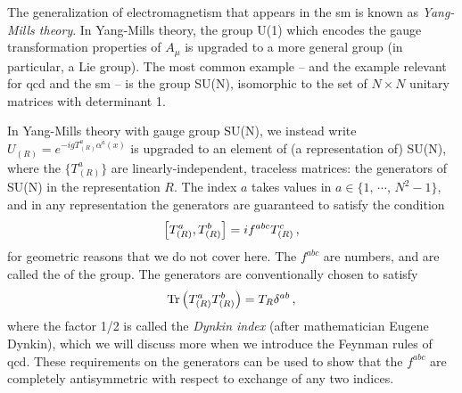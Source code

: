 The generalization of electromagnetism that appears in the \gls{sm} is known as \textit{Yang-Mills theory}.
%
In Yang-Mills theory, the group U(1) which encodes the gauge transformation properties of \(A_\mu\) is upgraded to a more general group (in particular, a Lie group).
%
The most common example -- and the example relevant for \gls{qcd} and the \gls{sm} -- is the group SU(N), isomorphic to the set of \(N\times N\) unitary matrices with determinant 1.



In Yang-Mills theory with gauge group SU(N), we instead write \(U_{(R)} = e^{-i g T_{(R)}^a \alpha^a(x)}\) is upgraded to an element of (a representation of) SU(N), where the \(\{T^a_{(R)}\}\) are linearly-independent, traceless matrices:
%
the generators of SU(N) in the representation \(R\).
%
The index \(a\) takes values in \(a \in \{1,\,\cdots,\,N^2-1\}\), and in any representation the generators are guaranteed to satisfy the condition
\begin{align}
    \comm{T^a_{(R)}}{T^b_{(R)}}
    =
    i f^{abc} T^c_{(R)}
    \,,
\end{align}
for geometric reasons that we do not cover here.
%
The \(f^{abc}\) are numbers, and are called the  of the group.
%
The generators are conventionally chosen to satisfy
\begin{align}
    \Tr\left(T_{(R)}^a T_{(R)}^b\right) = T_R \delta^{ab}
    \,,
\end{align}
where the factor 1/2 is called the \textit{Dynkin index} (after mathematician Eugene Dynkin), which we will discuss more when we introduce the Feynman rules of \gls{qcd}.
%
These requirements on the generators can be used to show that the \(f^{abc}\) are completely antisymmetric with respect to exchange of any two indices.


